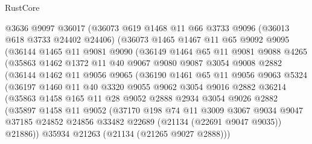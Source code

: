 \begin{lexlean}{RustCore}
\begin{coremodule}
        @3636
        @9097
        @36017
        (@36073
          @619
          @1468
          @11
          @66
          @3733
          @9096
          (@36013 @618 @3733 @24402 @24406)
          (@36073
            @1465
            @1467
            @11
            @65
            @9092
            @9095
            (@36144
              @1465
              @11
              @9081
              @9090
              (@36149
                @1464
                @65
                @11
                @9081
                @9088
                @4265
                (@35863
                  @1462
                  @1372
                  @11
                  @40
                  @9067
                  @9080
                  @9087
                  @3054
                  @9008
                  @2882
                  (@36144
                    @1462
                    @11
                    @9056
                    @9065
                    (@36190
                      @1461
                      @65
                      @11
                      @9056
                      @9063
                      @5324
                      (@36197
                        @1460
                        @11
                        @40
                        @3320
                        @9055
                        @9062
                        @3054
                        @9016
                        @2882
                        @36214
                        (@35863
                          @1458
                          @165
                          @11
                          @28
                          @9052
                          @2888
                          @2934
                          @3054
                          @9026
                          @2882
                          (@35897
                            @1458
                            @11
                            @9052
                            (@37170
                              @198
                              @74
                              @11
                              @3009
                              @3067
                              @9034
                              @9047
                              @37185
                              @24852
                              @24856
                              @33482
                              @22689
                              (@21134 (@22691 @9047 @9035))
                              @21886))
                          @35934
                          @21263
                          (@21134 (@21265 @9027 @2888)))

\end{coremodule}
\end{lexlean}

